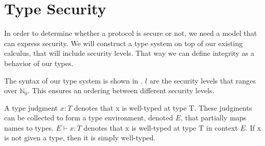\section{Type Security}
In order to determine whether a protocol is secure or not, we need a model that can express security.
We will construct a type system on top of our existing calculus, that will include security levels.
That way we can define integrity as a behavior of our types.


\noindent The syntax of our type system is shown in .
$l$ are the security levels that ranges over $\mathbb{N}_0$.
This ensures an ordering between different security levels.


\noindent A type judgment $x:T$ denotes that x is well-typed at type T.
These judgments can be collected to form a type environment, denoted $E$, that partially maps names to types.
$E\vdash x:T$ denotes that x is well-typed at type T in context $E$.
If x is not given a type, then it is simply well-typed.


